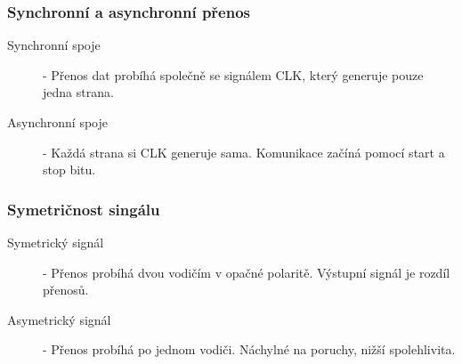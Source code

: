 \subsubsection{Synchronní a asynchronní přenos}
\begin{description}
  \item[Synchronní spoje]- Přenos dat probíhá společně se signálem CLK, který generuje pouze jedna strana.
  \item[Asynchronní spoje]- Každá strana si CLK generuje sama. Komunikace začíná pomocí start a stop bitu.
\end{description}
\subsubsection{Symetričnost singálu}
\begin{description}
  \item[Symetrický signál]- Přenos probíhá dvou vodičím v opačné polaritě. Výstupní signál je rozdíl přenosů.
  \item[Asymetrický signál]- Přenos probíhá po jednom vodiči. Náchylné na poruchy, nižší spolehlivita.
\end{description}
